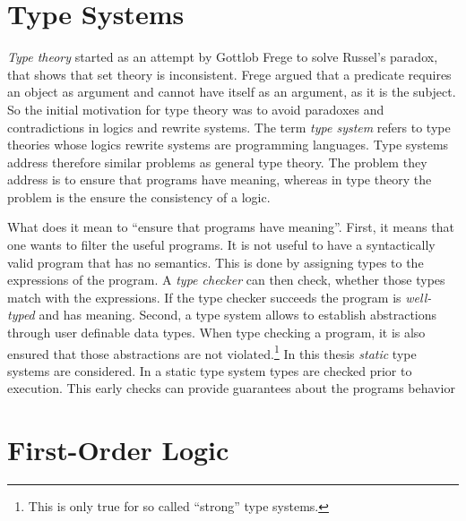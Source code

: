 \section{Type Systems}
\textit{Type theory} started as an attempt by Gottlob Frege to solve Russel's
paradox, that shows that \naive set theory is inconsistent. Frege
argued that a predicate requires an object as argument and cannot have
itself as an argument, as it is the subject. So the initial motivation for type theory was to avoid
paradoxes and contradictions in logics and rewrite systems. The term
\textit{type system} refers to type theories whose logics rewrite
systems are programming languages. Type systems address therefore
similar problems as general type theory. The problem they address is
to ensure that programs have meaning, whereas in type theory the
problem is the ensure the consistency of a logic.

What does it mean to ``ensure that programs have meaning''. First, it
means that one wants to filter the useful programs. It is not useful
to have a syntactically valid program that has no semantics. This is
done by assigning types to the expressions of the program. A
\textit{type checker} can then check, whether those types match with
the expressions. If the type checker succeeds the program is
\textit{well-typed} and has meaning. Second, a type system allows to
establish abstractions through user definable data types. When type
checking a program, it is also ensured that those abstractions are not
violated.\footnote{This is only true for so called ``strong'' type
  systems.} In this thesis \textit{static} type systems are
considered. In a static type system types are checked prior to
execution. This early checks can provide guarantees about the programs
behavior 
\section{First-Order Logic}

